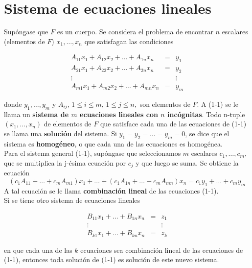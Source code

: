 \section{Sistema de ecuaciones lineales}
Supóngase que $F$ es un cuerpo. Se considera el problema de encontrar $n$ escalares (elementos de $F$) $x_1,\ldots,x_n$ que satisfagan las condiciones 

\begin{equation}
    \begin{array}{ccc}
	A_{11}x_1+A_{12}x_2+\ldots + A_{1n}x_n&=&y_1\\
	A_{21}x_1+A_{22}x_2+\ldots + A_{2n}x_n&=&y_2\\
	\vdots &&\vdots\\
	A_{m1}x_1+A_{m2}x_2+\ldots + A_{mn}x_n&=&y_m
    \end{array}
\end{equation}

donde $y_1,\ldots , y_{m}$ y $A_{ij}$, $1\leq i \leq m$, $1\leq j \leq n,$ son elementos de $F$. A (1-1) se le llama un \textbf{\boldmath sistema de $m$ ecuaciones lineales con $n$ incógnitas}. Todo n-tuple $(x_1,\ldots,x_n)$ de elementos de $F$ que satisface cada una de las ecuaciones de (1-1) se llama una \textbf{solución} del sistema. Si $y_1=y_2=\ldots = y_m=0$, se dice que el sistema es \textbf{homogéneo}, o que cada una de las ecuaciones es homogénea.\\

Para el sistema general (1-1), supóngase que seleccionamos $m$ escalares $c_1,\ldots, c_m$, que se multiplica la j-ésima ecuación por $c_j$ y que luego se suma. Se obtiene la ecuación
$$(c_1 A_{11}+\ldots +c_m A_{m1})x_1+\ldots+(c_1A_{1n}+\ldots + c_mA_{mn})x_n=c_1y_1+\ldots+c_my_m$$
A tal ecuación se le llama \textbf{combinación lineal} de las ecuaciones (1-1).\\ 

Si se tiene otro sistema de ecuaciones lineales

\begin{equation}
    \begin{array}{ccc}
	B_{11}x_1+\ldots + B_{1n}x_n&=&z_1\\
	\vdots &&\vdots\\
	B_{k1}x_1+\ldots + B_{kn}x_n&=&z_k
    \end{array}
\end{equation}

en que cada una de las $k$ ecuaciones sea combinación lineal de las ecuaciones de (1-1), entonces toda solución de (1-1) es solución de este nuevo sistema.\\ 

